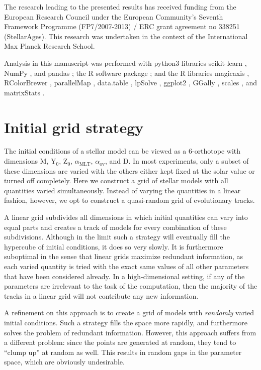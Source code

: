 \documentclass[manuscript]{aastex}
\begin{document}
\acknowledgments The research leading to the presented results has received funding from the European Research Council under the European Community's Seventh Framework Programme (FP7/2007-2013) / ERC grant agreement no 338251 (StellarAges). This research was undertaken in the context of the International Max Planck Research School. 

Analysis in this manuscript was performed with python3 libraries scikit-learn \citep{scikit-learn}, NumPy \citep{van2011numpy}, and pandas \citep{mckinney2010data}; the R software package \citep{R}; and the R libraries magicaxis \citep{magicaxis}, RColorBrewer \citep{RColorBrewer}, parallelMap \citep{parallelMap}, data.table \citep{data.table}, lpSolve \citep{lpSolve}, ggplot2 \citep{ggplot2}, GGally \citep{GGally}, scales \citep{scales}, and matrixStats \citep{matrixStats}. 

\appendix

\section{Initial grid strategy}
\label{sec:grid}
The initial conditions of a stellar model can be viewed as a 6-orthotope with dimensions M, Y$_0$, Z$_0$, $\alpha_{\text{MLT}}$, $\alpha_{\text{ov}}$, and D. In most experiments, only a subset of these dimensions are varied with the others either kept fixed at the solar value or turned off completely. Here we construct a grid of stellar models with all quantities varied simultaneously. Instead of varying the quantities in a linear fashion, however, we opt to construct a quasi-random grid of evolutionary tracks. 

A linear grid subdivides all dimensions in which initial quantities can vary into equal parts and creates a track of models for every combination of these subdivisions. Although in the limit such a strategy will eventually fill the hypercube of initial conditions, it does so very slowly. It is furthermore suboptimal in the sense that linear grids maximize redundant information, as each varied quantity is tried with the exact same values of all other parameters that have been considered already. In a high-dimensional setting, if any of the parameters are irrelevant to the task of the computation, then the majority of the tracks in a linear grid will not contribute any new information.

A refinement on this approach is to create a grid of models with \emph{randomly} varied initial conditions. Such a strategy fills the space more rapidly, and furthermore solves the problem of redundant information. However, this approach suffers from a different problem: since the points are generated at random, they tend to ``clump up'' at random as well. This results in random gaps in the parameter space, which are obviously undesirable. 
\end{document}
